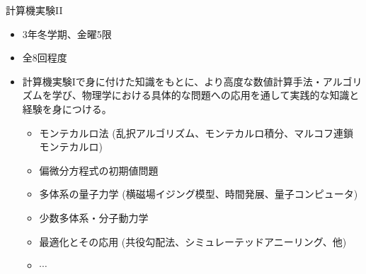 \documentclass[10pt,dvipdfmx]{beamer}
\begin{document}
\begin{frame}[t,fragile]{計算機実験II}
  \begin{itemize}
  \item 3年冬学期、金曜5限
  \item 全8回程度
  \item 計算機実験Iで身に付けた知識をもとに、より高度な数値計算手法・アルゴリズムを学び、物理学における具体的な問題への応用を通して実践的な知識と経験を身につける。
    \begin{itemize}
      \item モンテカルロ法 (乱択アルゴリズム、モンテカルロ積分、マルコフ連鎖モンテカルロ)
      \item 偏微分方程式の初期値問題
      \item 多体系の量子力学 (横磁場イジング模型、時間発展、量子コンピュータ)
      \item 少数多体系・分子動力学
      \item 最適化とその応用 (共役勾配法、シミュレーテッドアニーリング、他)
      \item $\cdots$
    \end{itemize}
  \end{itemize}
\end{frame}
\end{document}
